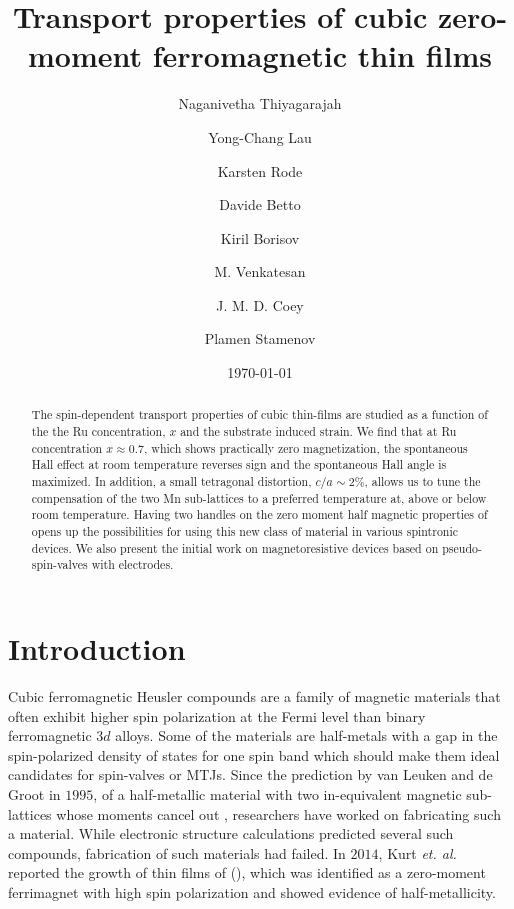 \documentclass[reprint,aip,apl,floatfix,linenumbers,superscriptaddress]{revtex4-1}
\begin{document}
\title{Transport properties of cubic zero-moment ferromagnetic  thin films}
\author{Naganivetha Thiyagarajah}
\author{Yong-Chang Lau}
\author{Karsten Rode}
\author{Davide Betto}
\author{Kiril Borisov}
\author{M. Venkatesan}
\author{J. M. D. Coey}
\author{Plamen Stamenov}

\date{\today}

\begin{abstract}
The spin-dependent transport properties of cubic  thin-films are studied as a function of the the Ru concentration, $x$ and the substrate induced strain. We find that at Ru concentration $x\approx\num{0.7}$, which shows practically zero magnetization, the spontaneous Hall effect at room temperature reverses sign and the spontaneous Hall angle is maximized. In addition, a small tetragonal distortion, $c/a\sim\num{2}\%$, allows us to tune the compensation of the two Mn sub-lattices to a preferred temperature at, above or below room temperature. Having two handles on the zero moment half magnetic properties of  opens up the possibilities for using this new class of material in various spintronic devices. We also present the initial work on magnetoresistive devices based on pseudo-spin-valves with  electrodes.

\end{abstract}
\maketitle

\section{Introduction}
\label{sec:intro}

Cubic ferromagnetic Heusler compounds are a family of magnetic materials that often exhibit higher spin polarization at the Fermi level than binary ferromagnetic $3d$ alloys\cite{Graf2013}. Some of the materials are half-metals with a gap in the spin-polarized density of states for one spin band which should make them ideal candidates for spin-valves or MTJs\cite{PhysRevB.28.1745,Wang2009,Takahashi2011,Tsunegi2008}.  Since the prediction by van Leuken and de Groot in $1995$, of a half-metallic material with two in-equivalent magnetic sub-lattices whose moments cancel out \cite{PhysRevLett.50.2024}, researchers have worked on fabricating such a material. While electronic structure calculations predicted several such compounds\cite{Wurmehl2006, Hu2012, Galanakis2006}, fabrication of such materials had failed\cite{Hu2012,PhysRevB.79.100406}. In $2014$, Kurt \textit{et. al.} reported the growth of thin films of  (), which was identified as a zero-moment ferrimagnet with high spin polarization and showed evidence of half-metallicity\cite{KurtPRL2014}. 
\end{document}
